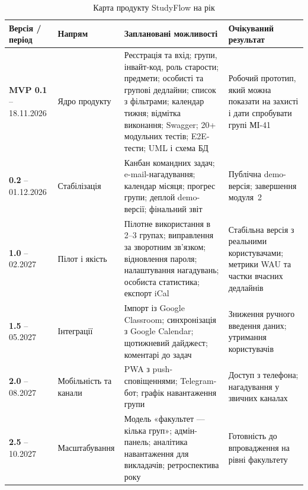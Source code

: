\documentclass[12pt]{article}
\begin{document}
\begin{table}[H]
\centering
\renewcommand{\arraystretch}{1.25}
\small
\begin{tabularx}{\textwidth}{L{2.4cm} L{2.6cm} Y Y}
\toprule
\textbf{Версія / період} & \textbf{Напрям} & \textbf{Заплановані можливості} & \textbf{Очікуваний результат}\\
\midrule
\textbf{MVP 0.1} -- 18.11.2026 & Ядро продукту &
Реєстрація та вхід; групи, інвайт-код, роль старости; предмети; особисті та групові дедлайни; список з фільтрами; календар тижня; відмітка виконання; Swagger; 20+ модульних тестів; E2E-тести; UML і схема БД &
Робочий прототип, який можна показати на захисті і дати спробувати групі МІ-41\\
\addlinespace
\textbf{0.2} -- 01.12.2026 & Стабілізація &
Канбан командних задач; e-mail-нагадування; календар місяця; прогрес групи; деплой demo-версії; фінальний звіт &
Публічна demo-версія; завершення модуля~2\\
\addlinespace
\textbf{1.0} -- 02.2027 & Пілот і якість &
Пілотне використання в 2--3 групах; виправлення за зворотним зв'язком; відновлення пароля; налаштування нагадувань; особиста статистика; експорт iCal &
Стабільна версія з реальними користувачами; метрики WAU та частки вчасних дедлайнів\\
\addlinespace
\textbf{1.5} -- 05.2027 & Інтеграції &
Імпорт із Google Classroom; синхронізація з Google Calendar; щотижневий дайджест; коментарі до задач &
Зниження ручного введення даних; утримання користувачів\\
\addlinespace
\textbf{2.0} -- 08.2027 & Мобільність та канали &
PWA з push-сповіщеннями; Telegram-бот; графік навантаження групи &
Доступ з телефона; нагадування у звичних каналах\\
\addlinespace
\textbf{2.5} -- 10.2027 & Масштабування &
Модель «факультет --- кілька груп»; адмін-панель; аналітика навантаження для викладачів; ретроспектива року &
Готовність до впровадження на рівні факультету\\
\bottomrule
\end{tabularx}
\caption{Карта продукту StudyFlow на рік}
\end{table}
\end{document}
